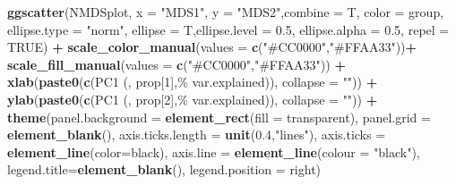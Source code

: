 \documentclass[
]{article}
\newenvironment{Shaded}{\begin{snugshade}}{\end{snugshade}}
\newcommand{\AttributeTok}[1]{\textcolor[rgb]{0.13,0.29,0.53}{#1}}
\newcommand{\ConstantTok}[1]{\textcolor[rgb]{0.56,0.35,0.01}{#1}}
\newcommand{\DecValTok}[1]{\textcolor[rgb]{0.00,0.00,0.81}{#1}}
\newcommand{\FloatTok}[1]{\textcolor[rgb]{0.00,0.00,0.81}{#1}}
\newcommand{\FunctionTok}[1]{\textcolor[rgb]{0.13,0.29,0.53}{\textbf{#1}}}
\newcommand{\NormalTok}[1]{#1}
\newcommand{\SpecialCharTok}[1]{\textcolor[rgb]{0.81,0.36,0.00}{\textbf{#1}}}
\newcommand{\StringTok}[1]{\textcolor[rgb]{0.31,0.60,0.02}{#1}}
\begin{document}
\begin{Shaded}
\begin{Highlighting}[]
\FunctionTok{ggscatter}\NormalTok{(NMDSplot, }\AttributeTok{x =} \StringTok{"MDS1"}\NormalTok{, }\AttributeTok{y =} \StringTok{"MDS2"}\NormalTok{,}\AttributeTok{combine  =}\NormalTok{ T, }\AttributeTok{color =} \StringTok{\textquotesingle{}group\textquotesingle{}}\NormalTok{,}
          \AttributeTok{ellipse.type =} \StringTok{"norm"}\NormalTok{, }\AttributeTok{ellipse =}\NormalTok{ T,}\AttributeTok{ellipse.level =} \FloatTok{0.5}\NormalTok{, }\AttributeTok{ellipse.alpha =} \FloatTok{0.5}\NormalTok{, }\AttributeTok{repel =} \ConstantTok{TRUE}\NormalTok{) }\SpecialCharTok{+}
          \FunctionTok{scale\_color\_manual}\NormalTok{(}\AttributeTok{values =} \FunctionTok{c}\NormalTok{(}\StringTok{"\#CC0000"}\NormalTok{,}\StringTok{"\#FFAA33"}\NormalTok{))}\SpecialCharTok{+}
          \FunctionTok{scale\_fill\_manual}\NormalTok{(}\AttributeTok{values =} \FunctionTok{c}\NormalTok{(}\StringTok{"\#CC0000"}\NormalTok{,}\StringTok{"\#FFAA33"}\NormalTok{)) }\SpecialCharTok{+}
          \FunctionTok{xlab}\NormalTok{(}\FunctionTok{paste0}\NormalTok{(}\FunctionTok{c}\NormalTok{(}\StringTok{\textquotesingle{}PC1 (\textquotesingle{}}\NormalTok{, prop[}\DecValTok{1}\NormalTok{],}\StringTok{\textquotesingle{}\% var.explained)\textquotesingle{}}\NormalTok{), }\AttributeTok{collapse =} \StringTok{""}\NormalTok{)) }\SpecialCharTok{+} 
          \FunctionTok{ylab}\NormalTok{(}\FunctionTok{paste0}\NormalTok{(}\FunctionTok{c}\NormalTok{(}\StringTok{\textquotesingle{}PC1 (\textquotesingle{}}\NormalTok{, prop[}\DecValTok{2}\NormalTok{],}\StringTok{\textquotesingle{}\% var.explained)\textquotesingle{}}\NormalTok{), }\AttributeTok{collapse =} \StringTok{""}\NormalTok{)) }\SpecialCharTok{+}
          \FunctionTok{theme}\NormalTok{(}\AttributeTok{panel.background =} \FunctionTok{element\_rect}\NormalTok{(}\AttributeTok{fill =} \StringTok{\textquotesingle{}transparent\textquotesingle{}}\NormalTok{),}
                \AttributeTok{panel.grid =} \FunctionTok{element\_blank}\NormalTok{(),}
                \AttributeTok{axis.ticks.length =} \FunctionTok{unit}\NormalTok{(}\FloatTok{0.4}\NormalTok{,}\StringTok{"lines"}\NormalTok{),}
                \AttributeTok{axis.ticks =} \FunctionTok{element\_line}\NormalTok{(}\AttributeTok{color=}\StringTok{\textquotesingle{}black\textquotesingle{}}\NormalTok{),}
                \AttributeTok{axis.line =} \FunctionTok{element\_line}\NormalTok{(}\AttributeTok{colour =} \StringTok{"black"}\NormalTok{),}
                \AttributeTok{legend.title=}\FunctionTok{element\_blank}\NormalTok{(),}
                \AttributeTok{legend.position  =} \StringTok{\textquotesingle{}right\textquotesingle{}}\NormalTok{)}
\end{Highlighting}
\end{Shaded}
\end{document}
